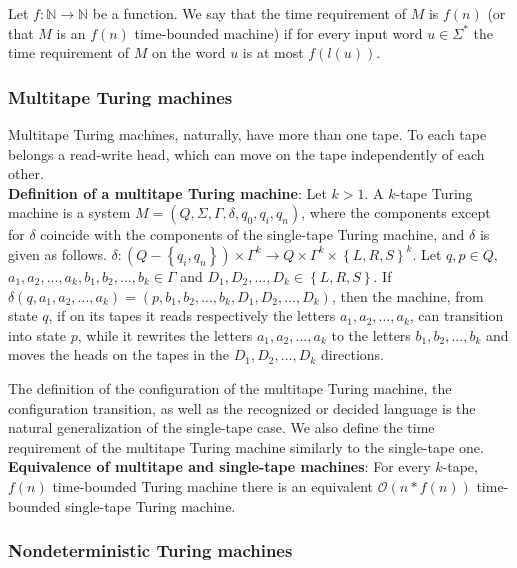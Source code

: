 \documentclass[margin=0px]{article}
\begin{document}
Let $f : \mathbb{N} \to \mathbb{N}$ be a function. We say that the time requirement of $M$ is $f(n)$ (or that $M$
is an $f(n)$ time-bounded machine) if for every input word $u \in \Sigma^{*}$ the time requirement of $M$ on the word $u$ is at most $f(l(u))$.

\subsubsection{Multitape Turing machines}

Multitape Turing machines, naturally, have more than one tape.
To each tape belongs a read-write head, which can move on the tape independently of each other.\\

\noindent \textbf{Definition of a multitape Turing machine}: Let $k > 1$. A $k$-tape Turing machine is a system
$M = (Q, \Sigma, \Gamma, \delta, q_{0}, q_{i}, q_{n})$, where the components except for $\delta$
coincide with the components of the single-tape Turing machine, and $\delta$ is given as follows.
$\delta : (Q - \left\{q_{i},q_{n}\right\}) \times \Gamma^{k} \to Q \times \Gamma^{k} \times \left\{L, R, S\right\}^{k}$.
Let $q, p \in Q$, $a_{1}, a_{2}, ... , a_{k}, b_{1}, b_{2}, ..., b_{k} \in \Gamma$ and
$D_{1}, D_{2}, ..., D_{k} \in \left\{L, R, S\right\}$. If $\delta(q,a_{1}, a_{2}, ... , a_{k}) = (p,b_{1}, b_{2}, ..., b_{k}, D_{1}, D_{2}, ..., D_{k})$, then the machine, from state $q$, if on its tapes it reads respectively the letters
$a_{1}, a_{2}, ... , a_{k}$, can transition into state $p$, while it rewrites the letters
$a_{1}, a_{2}, ... , a_{k}$ to the letters $b_{1}, b_{2}, ... , b_{k}$ and moves the heads on the tapes in the
$D_{1}, D_{2}, ... , D_{k}$ directions.

The definition of the configuration of the multitape Turing machine, the configuration transition, as well as the
recognized or decided language is the natural generalization of the single-tape case.
We also define the time requirement of the multitape Turing machine similarly to the single-tape one.\\

\noindent \textbf{Equivalence of multitape and single-tape machines}: For every $k$-tape, $f(n)$ time-bounded Turing machine
there is an equivalent $\mathcal{O}(n*f(n))$ time-bounded single-tape Turing machine.

\subsubsection{Nondeterministic Turing machines}
\end{document}
